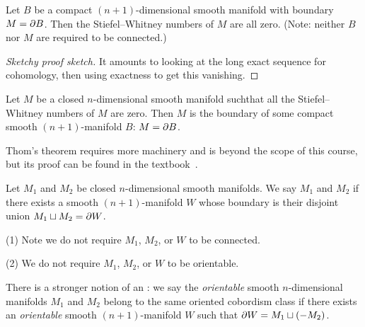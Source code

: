 
\lecture{}

\begin{theorem}[Pontryagin]
Let $B$ be a compact $(n+1)$-dimensional smooth manifold with boundary
$M=\partial B$. Then the Stiefel--Whitney numbers of $M$ are all
zero. (Note: neither $B$ nor $M$ are required to be connected.)
\end{theorem}

\begin{proof}[Sketchy proof sketch]
It amounts to looking at the long exact sequence for cohomology, then
using exactness to get this vanishing.
\end{proof}

\begin{theorem}[Thom]
Let $M$ be a closed $n$-dimensional smooth manifold suchthat all the
Stiefel--Whitney numbers of $M$ are zero. Then $M$ is the boundary of
some compact smooth $(n+1)$-manifold $B$: $M=\partial B$.
\end{theorem}

\begin{remark}
Thom's theorem requires more machinery and is beyond the scope of this
course, but its proof can be found in the
textbook~\cite[Th~4.10]{milnor1974characteristic}. %
\end{remark}

\begin{definition}
Let $M_{1}$ and $M_{2}$ be closed $n$-dimensional smooth manifolds.
We say $M_{1}$ and $M_{2}$  if
there exists a smooth $(n+1)$-manifold $W$ whose boundary is their
disjoint union $M_{1}\sqcup M_{2}=\partial W$. 
\end{definition}

\begin{remark}
(1) Note we do not require $M_{1}$, $M_{2}$, or $W$ to be connected.

(2) We do not require $M_{1}$, $M_{2}$, or $W$ to be orientable.
\end{remark}

\begin{remark}
There is a stronger notion of an : 
we say the \emph{orientable} smooth $n$-dimensional manifolds
$M_{1}$ and $M_{2}$ belong to the same oriented cobordism class
if there exists an \emph{orientable} smooth $(n+1)$-manifold $W$ such
that $\partial W = M_{1}\sqcup(-M_{2})$.
\end{remark}

